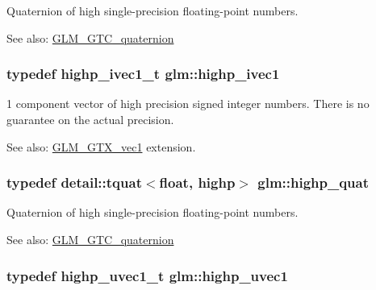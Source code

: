 Quaternion of high single-precision floating-point numbers.

\begin{Desc}
\item[See also:]\hyperlink{group__gtc__quaternion}{GLM\_\-GTC\_\-quaternion} \end{Desc}
\hypertarget{namespaceglm_ddb6724b01f125e2730aeaad6130b06f}{
\subsubsection[highp\_\-ivec1]{\setlength{\rightskip}{0pt plus 5cm}typedef highp\_\-ivec1\_\-t {\bf glm::highp\_\-ivec1}}}
\label{namespaceglm_ddb6724b01f125e2730aeaad6130b06f}


1 component vector of high precision signed integer numbers. There is no guarantee on the actual precision. \begin{Desc}
\item[See also:]\hyperlink{group__gtx__vec1}{GLM\_\-GTX\_\-vec1} extension. \end{Desc}
\hypertarget{namespaceglm_8d2836172e6561f6519c39d0b5d025c1}{
\subsubsection[highp\_\-quat]{\setlength{\rightskip}{0pt plus 5cm}typedef detail::tquat$<$float, highp$>$ {\bf glm::highp\_\-quat}}}
\label{namespaceglm_8d2836172e6561f6519c39d0b5d025c1}


Quaternion of high single-precision floating-point numbers.

\begin{Desc}
\item[See also:]\hyperlink{group__gtc__quaternion}{GLM\_\-GTC\_\-quaternion} \end{Desc}
\hypertarget{namespaceglm_2a480125ab05aa522d883651ea1101f8}{
\subsubsection[highp\_\-uvec1]{\setlength{\rightskip}{0pt plus 5cm}typedef highp\_\-uvec1\_\-t {\bf glm::highp\_\-uvec1}}}
\label{namespaceglm_2a480125ab05aa522d883651ea1101f8}



